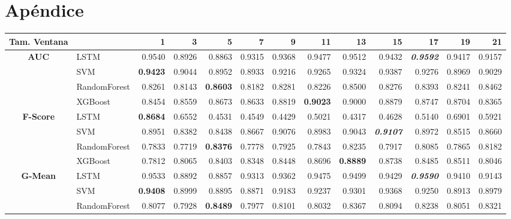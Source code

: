 \chapter{Apéndice}
\appendix
\begin{table}[H]
	\begin{adjustbox}{max width=14cm}
		\centering
		\begin{tabular}{|c|l|r|r|r|r|r|r|r|r|r|r|r|}
			\hline
			\textbf{Tam. Ventana}
			&         &      1  &      3  &      5  &      7  &      9  &      11 &      13 &      15 &      17 &      19 &      21 \\
			\hline
			\textbf{AUC} & LSTM &  0.9540 &  0.8926 &  0.8863 &  0.9315 &  0.9368 &  0.9477 &  0.9512 &  0.9432 &  \textit{\textbf{0.9592}} &  0.9417 &  0.9157 \\
			& SVM &  \textbf{0.9423} &  0.9044 &  0.8952 &  0.8933 &  0.9216 &  0.9265 &  0.9324 &  0.9387 &  0.9276 &  0.8969 &  0.9029 \\
			& RandomForest &  0.8261 &  0.8143 &  \textbf{0.8603} &  0.8182 &  0.8281 &  0.8226 &  0.8500 &  0.8276 &  0.8393 &  0.8241 &  0.8462 \\
			& XGBoost &  0.8454 &  0.8559 &  0.8673 &  0.8633 &  0.8819 & \textbf{0.9023} &  0.9000 &  0.8879 &  0.8747 &  0.8704 &  0.8365 \\
			\hline
			\textbf{F-Score} & LSTM &  \textbf{0.8684} &  0.6552 &  0.4531 &  0.4549 &  0.4429 &  0.5021 &  0.4317 &  0.4628 &  0.5140 &  0.6901 &  0.5921 \\
			& SVM &  0.8951 &  0.8382 &  0.8438 &  0.8667 &  0.9076 &  0.8983 &  0.9043 &  \textit{\textbf{0.9107}} &  0.8972 &  0.8515 &  0.8660 \\
			& RandomForest &  0.7833 &  0.7719 &  \textbf{0.8376} &  0.7778 &  0.7925 &  0.7843 &  0.8235 &  0.7917 &  0.8085 &  0.7865 &  0.8182 \\
			& XGBoost &  0.7812 &  0.8065 &  0.8403 &  0.8348 &  0.8448 &  0.8696 &  \textbf{0.8889} &  0.8738 &  0.8485 &  0.8511 &  0.8046 \\
			\hline
			\textbf{G-Mean} & LSTM &  0.9533 &  0.8892 &  0.8857 &  0.9313 &  0.9362 &  0.9475 &  0.9499 &  0.9429 &  \textit{\textbf{0.9590}} &  0.9410 &  0.9143 \\
			& SVM &  \textbf{0.9408} &  0.8999 &  0.8895 &  0.8871 &  0.9183 &  0.9237 &  0.9301 &  0.9368 &  0.9250 &  0.8913 &  0.8979 \\
			& RandomForest &  0.8077 &  0.7928 &  \textbf{0.8489} &  0.7977 &  0.8101 &  0.8032 &  0.8367 &  0.8094 &  0.8238 &  0.8051 &  0.8321 \\

\end{tabular}
\end{adjustbox}
\end{table}
